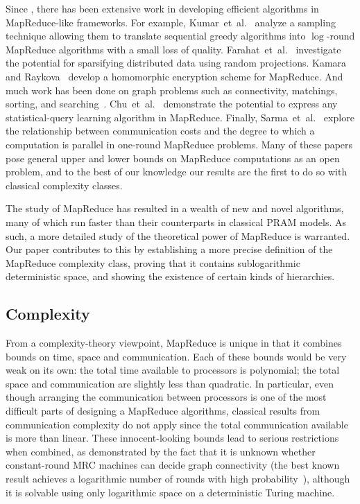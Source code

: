 \documentclass[11pt]{article}
\theoremstyle{definition}
\theoremstyle{remark}
\begin{document}
Since \cite{Karloff10}, there has been extensive work in developing efficient
algorithms in MapReduce-like frameworks. For example,
Kumar~et~al.~\cite{KMVV13} analyze a sampling technique allowing them to
translate sequential greedy algorithms into $\log$-round MapReduce algorithms
with a small loss of quality.  Farahat~et~al.~\cite{FEGK13} investigate the
potential for sparsifying distributed data using random projections. Kamara and
Raykova~\cite{KR13} develop a homomorphic encryption scheme for MapReduce. And
much work has been done on graph problems such as connectivity, matchings,
sorting, and searching~\cite{GoodrichSZ11}. Chu~et~al.~\cite{ChuKLYBNO06}
demonstrate the potential to express any statistical-query learning algorithm
in MapReduce.  Finally, Sarma~et~al.~\cite{Sarma13} explore the relationship
between communication costs and the degree to which a computation is parallel
in one-round MapReduce problems. Many of these papers pose general upper and
lower bounds on MapReduce computations as an open problem, and to the best of
our knowledge our results are the first to do so with classical complexity
classes.

The study of MapReduce has resulted in a wealth of new and novel algorithms,
many of which run faster than their counterparts in classical PRAM models. As
such, a more detailed study of the theoretical power of MapReduce is warranted.
Our paper contributes to this by establishing a more precise definition of the
MapReduce complexity class, proving that it contains sublogarithmic
deterministic space, and showing the existence of certain kinds of hierarchies.

\subsection{Complexity}

From a complexity-theory viewpoint, MapReduce is unique in that it combines
bounds on time, space and communication. Each of these bounds would be very
weak on its own: the total time available to processors is polynomial; the
total space and communication are slightly less than quadratic.  In particular,
even though arranging the communication between processors is one of the most
difficult parts of designing a MapReduce algorithms, classical results from
communication complexity do not apply since the total communication available
is more than linear. These innocent-looking bounds lead to serious restrictions
when combined, as demonstrated by the fact that it is unknown whether
constant-round MRC machines can decide graph connectivity (the best known
result achieves a logarithmic number of rounds with high
probability~\cite{Karloff10}), although it is solvable using only logarithmic
space on a deterministic Turing machine.
\end{document}
